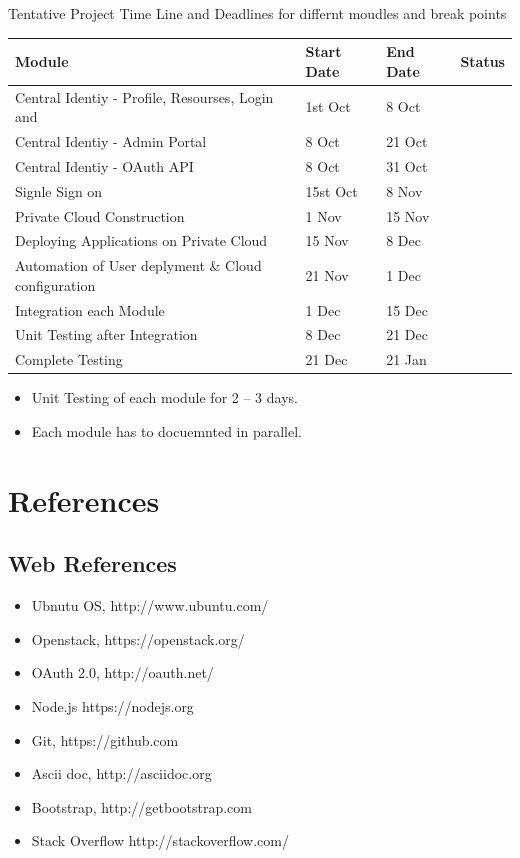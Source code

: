 \documentclass[12pt]{report}
\begin{document}
	Tentative Project Time Line and Deadlines for differnt moudles and break points
	
	\begin{table}[H]
		
		\begin{tabular}{ | l | l | l | l |}
			\hline 
			\textbf{Module} & \textbf{Start Date} & \textbf{End Date} & \textbf{Status} \\
			\hline 
			Central Identiy - Profile, Resourses, Login and & 1st Oct & 8 Oct & \\
			\hline
			Central Identiy - Admin Portal & 8 Oct & 21 Oct & \\
			\hline
			Central Identiy - OAuth API & 8 Oct & 31 Oct & \\
			\hline
			Signle Sign on & 15st Oct & 8 Nov & \\
			\hline
			Private Cloud Construction & 1 Nov & 15 Nov  & \\
			\hline 
			Deploying Applications on Private Cloud & 15 Nov & 8 Dec & \\
			\hline 
			Automation of User deplyment \& Cloud configuration & 21 Nov & 1 Dec & \\
			\hline 
			Integration each Module & 1 Dec & 15 Dec & \\
			\hline
			Unit Testing after Integration & 8 Dec & 21 Dec  & \\
			\hline
			Complete Testing & 21 Dec & 21 Jan &  \\
				
			\hline 
		\end{tabular}
		
	\end{table}
	
	\begin{itemize}
		\item Unit Testing of each module for 2 -- 3 days.
		\item Each module has to docuemnted in parallel.
	\end{itemize}
	
\chapter{References}

\section{Web References}

\begin{itemize}
\item Ubnutu OS, http://www.ubuntu.com/
\item Openstack, https://openstack.org/
\item OAuth 2.0, http://oauth.net/
\item Node.js https://nodejs.org
\item Git, https://github.com
\item Ascii doc, http://asciidoc.org
\item Bootstrap, http://getbootstrap.com 
\item Stack Overflow http://stackoverflow.com/

\end{itemize}
		
\end{document}
